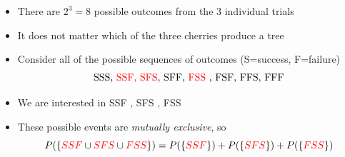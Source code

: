 \documentclass[smaller, handout]{beamer}\usepackage[]{graphicx}\usepackage[]{color}
\renewcommand{\Pr}{P}
\newenvironment{stepitemize}{\begin{itemize}[<+->]}{\end{itemize} }
\begin{document}
\begin{frame}{\secname}%


\begin{example}[continued]

\begin{stepitemize}
\item There are $2^{3}=8$ possible outcomes from the $3$ individual trials

\item It does not matter which of the three cherries produce a tree

\item Consider all of the possible sequences of outcomes (S=success,
F=failure)%
\begin{equation*}
\text{SSS,
\color{red}%
SSF,
\color{black}%
\color{red}%
SFS%
\color{black}%
, SFF,
\color{red}%
FSS
\color{black}, FSF, FFS, FFF}
\end{equation*}

\item We are interested in
\color{red}%
SSF%
\color{black}%
,
\color{red}%
SFS%
\color{black}%
,
\color{red}%
FSS%
\color{black}%

\item These possible events are \emph{mutually exclusive}, so%
\begin{equation*}
\Pr (\left\{
\color{red}%
SSF%
\color{black}%
\cup
\color{red}%
SFS%
\color{black}%
\cup
\color{red}%
FSS%
\color{black}%
\right\}) =\Pr (\left\{
\color{red}%
SSF%
\color{black}%
\right\}) +\Pr (\left\{
\color{red}%
SFS%
\color{black}%
\right\}) +\Pr (\left\{
\color{red}%
FSS%
\color{black}%
\right\})
\end{equation*}
\end{stepitemize}
\end{example}
\end{frame}%
\end{document}
